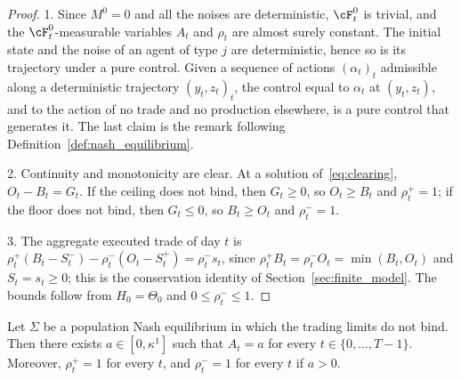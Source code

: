     \begin{proof}
        1. Since $M^0 = 0$ and all the noises are deterministic, $\cF^0_t$ is trivial, and the $\cF^0_t$-measurable variables $A_t$ and $\rho_t$ are almost surely constant. The initial state and the noise of an agent of type $j$ are deterministic, hence so is its trajectory under a pure control. Given a sequence of actions $(\alpha_t)_t$ admissible along a deterministic trajectory $(y_t, z_t)_t$, the control equal to $\alpha_t$ at $(y_t, z_t)$, and to the action of no trade and no production elsewhere, is a pure control that generates it. The last claim is the remark following Definition~\ref{def:nash_equilibrium}.

        2. Continuity and monotonicity are clear. At a solution of~\eqref{eq:clearing}, $O_t - B_t = G_t$. If the ceiling does not bind, then $G_t \ge 0$, so $O_t \ge B_t$ and $\rho^+_t = 1$; if the floor does not bind, then $G_t \le 0$, so $B_t \ge O_t$ and $\rho^-_t = 1$.

        3. The aggregate executed trade of day $t$ is $\rho^+_t (B_t - S^-_t) - \rho^-_t (O_t - S^+_t) = \rho^-_t s_t$, since $\rho^+_t B_t = \rho^-_t O_t = \min(B_t, O_t)$ and $S_t = s_t \ge 0$; this is the conservation identity of Section~\ref{sec:finite_model}. The bounds follow from $H_0 = \Theta_0$ and $0 \le \rho^-_t \le 1$.
    \end{proof}

    \begin{lemma}
        \label{lem:benchmark_constant}
        Let $\Sigma$ be a population Nash equilibrium in which the trading limits do not bind. Then there exists $a \in [0, \kappa^1]$ such that $A_t = a$ for every $t \in \{0, \dots, T-1\}$. Moreover, $\rho^+_t = 1$ for every $t$, and $\rho^-_t = 1$ for every $t$ if $a > 0$.
    \end{lemma}

